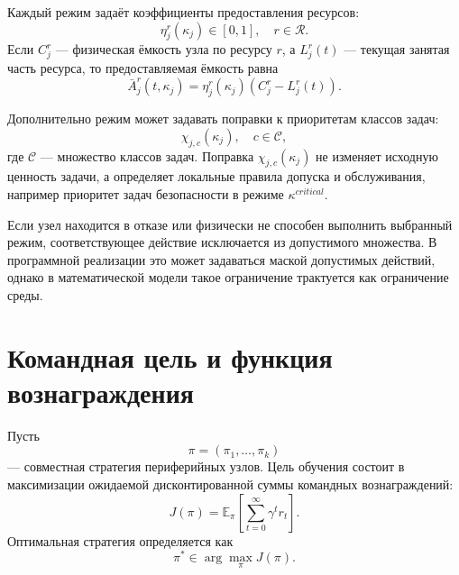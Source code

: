 Каждый режим задаёт коэффициенты предоставления ресурсов:
\begin{equation}
    \eta^r_j(\kappa_j)\in[0,1],
    \quad
    r\in\mathcal{R}.
    \label{eq:ch4_exposure_coeff}
\end{equation}
Если $C^r_j$ --- физическая ёмкость узла по ресурсу $r$, а $L^r_j(t)$ --- текущая занятая часть ресурса, то предоставляемая ёмкость равна
\begin{equation}
    \bar{A}^{r}_j(t,\kappa_j)
    =
    \eta^r_j(\kappa_j)
    \left(C^r_j - L^r_j(t)\right).
    \label{eq:ch4_exposed_capacity}
\end{equation}

Дополнительно режим может задавать поправки к приоритетам классов задач:
\begin{equation}
    \chi_{j,c}(\kappa_j),
    \quad c\in\mathcal{C},
    \label{eq:ch4_priority_modifier}
\end{equation}
где $\mathcal{C}$ --- множество классов задач. Поправка $\chi_{j,c}(\kappa_j)$ не изменяет исходную ценность задачи, а определяет локальные правила допуска и обслуживания, например приоритет задач безопасности в режиме $\kappa^{critical}$.

Если узел находится в отказе или физически не способен выполнить выбранный режим, соответствующее действие исключается из допустимого множества. В программной реализации это может задаваться маской допустимых действий, однако в математической модели такое ограничение трактуется как ограничение среды.

\section{Командная цель и функция вознаграждения}

Пусть
\begin{equation}
    \pi =
    \left(
        \pi_1,\ldots,\pi_k
    \right)
    \label{eq:ch4_joint_policy}
\end{equation}
--- совместная стратегия периферийных узлов. Цель обучения состоит в максимизации ожидаемой дисконтированной суммы командных вознаграждений:
\begin{equation}
    J(\pi)
    =
    \mathbb{E}_{\pi}
    \left[
        \sum_{t=0}^{\infty}
        \gamma^t r_t
    \right].
    \label{eq:ch4_learning_objective}
\end{equation}
Оптимальная стратегия определяется как
\begin{equation}
    \pi^*
    \in
    \arg\max_{\pi}
    J(\pi).
    \label{eq:ch4_optimal_policy}
\end{equation}

